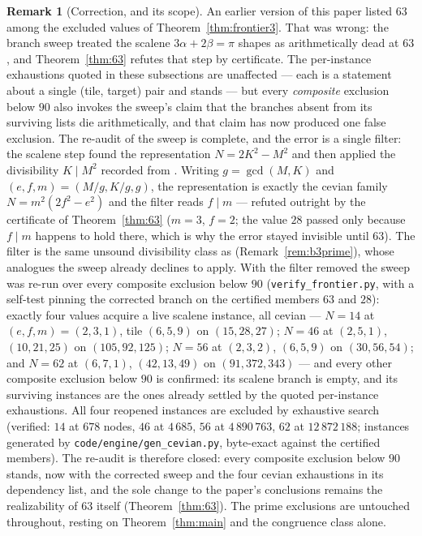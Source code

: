\documentclass[11pt,reqno]{amsart}
\theoremstyle{plain}
\theoremstyle{definition}
\newtheorem{remark}[theorem]{Remark}
\begin{document}
\begin{remark}[Correction, and its scope]\label{rem:63correction}
An earlier version of this paper listed $63$ among the excluded values of
Theorem~\ref{thm:frontier3}. That was wrong: the branch sweep treated the scalene
$3\alpha+2\beta=\pi$ shapes as arithmetically dead at $63$, and Theorem~\ref{thm:63} refutes that
step by certificate. The per-instance exhaustions quoted in these subsections are unaffected ---
each is a statement about a single (tile, target) pair and stands --- but every \emph{composite}
exclusion below $90$ also invokes the sweep's claim that the branches absent from its surviving
lists die arithmetically, and that claim has now produced one false exclusion. The re-audit of
the sweep is complete, and the error is a single filter: the scalene step found the
representation $N=2K^2-M^2$ and then applied the divisibility $K\mid M^2$ recorded from
\cite[Thm.~7]{BeesonIII}. Writing $g=\gcd(M,K)$ and $(e,f,m)=(M/g,K/g,g)$, the representation is
exactly the cevian family $N=m^2(2f^2-e^2)$ and the filter reads $f\mid m$ --- refuted outright
by the certificate of Theorem~\ref{thm:63} ($m=3$, $f=2$; the value $28$ passed only because
$f\mid m$ happens to hold there, which is why the error stayed invisible until $63$). The filter
is the same unsound divisibility class as \cite[Thms.~14, 19]{BeesonIII}
(Remark~\ref{rem:b3prime}), whose analogues the sweep already declines to apply. With the filter
removed the sweep was re-run over every composite exclusion below $90$
(\texttt{verify\_frontier.py}, with a self-test pinning the corrected branch on the certified
members $63$ and $28$): exactly four values acquire a live scalene instance, all cevian ---
$N=14$ at $(e,f,m)=(2,3,1)$, tile $(6,5,9)$ on $(15,28,27)$; $N=46$ at $(2,5,1)$, $(10,21,25)$ on
$(105,92,125)$; $N=56$ at $(2,3,2)$, $(6,5,9)$ on $(30,56,54)$; and $N=62$ at $(6,7,1)$,
$(42,13,49)$ on $(91,372,343)$ --- and every other composite exclusion below $90$ is confirmed:
its scalene branch is empty, and its surviving instances are the ones already settled by the
quoted per-instance exhaustions. All four reopened instances are excluded by exhaustive search
(verified: $14$ at $678$ nodes, $46$ at $4\,685$, $56$ at $4\,890\,763$, $62$ at
$12\,872\,188$; instances generated by \texttt{code/engine/gen\_cevian.py}, byte-exact against
the certified members). The re-audit is therefore closed: every composite exclusion below $90$
stands, now with the corrected sweep and the four cevian exhaustions in its dependency list, and
the sole change to the paper's conclusions remains the realizability of $63$ itself
(Theorem~\ref{thm:63}). The prime exclusions are untouched throughout, resting on
Theorem~\ref{thm:main} and the congruence class alone.
\end{remark}
\end{document}
